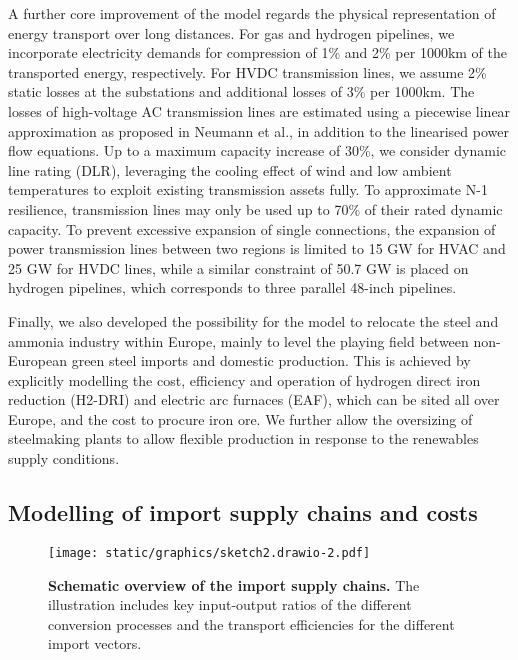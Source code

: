 A further core improvement of the model regards the physical representation of
energy transport over long distances. For gas and hydrogen pipelines, we
incorporate electricity demands for compression of 1\% and 2\% per 1000km
of the transported energy, respectively.\cite{gasforclimateEuropeanHydrogen2021}
For HVDC transmission lines, we assume 2\% static losses at the substations and
additional losses of 3\% per 1000km. The losses of high-voltage AC transmission
lines are estimated using a piecewise linear approximation as proposed in
Neumann et al.,\cite{neumannAssessmentsLinear2022} in addition to the linearised
power flow equations.\cite{horschLinearOptimal2018} Up to a maximum capacity
increase of 30\%, we consider dynamic line rating (DLR), leveraging the cooling
effect of wind and low ambient temperatures to exploit existing transmission
assets fully.\cite{glaumLeveragingExisting2023} To approximate N-1 resilience,
transmission lines may only be used up to 70\% of their rated dynamic capacity.
To prevent excessive expansion of single connections, the expansion of power
transmission lines between two regions is limited to 15 GW for HVAC and 25 GW
for HVDC lines, while a similar constraint of 50.7 GW is placed on hydrogen
pipelines, which corresponds to three parallel 48-inch
pipelines.\cite{gasforclimateEuropeanHydrogen2021}

Finally, we also developed the possibility for the model to relocate the steel
and ammonia industry within Europe, mainly to level the playing field between
non-European green steel imports and domestic production. This is achieved by
explicitly modelling the cost, efficiency and operation of hydrogen direct iron
reduction (H2-DRI) and electric arc furnaces (EAF), which can be sited all over
Europe, and the cost to procure iron ore. We further allow the oversizing of
steelmaking plants to allow flexible production in response to the renewables
supply conditions.

\subsection*{Modelling of import supply chains and costs}

\begin{figure*}
    \centering
    \texttt{[image: static/graphics/sketch2.drawio-2.pdf]}
    \caption{\textbf{Schematic overview of the import supply chains.} The
    illustration includes key input-output ratios of the different conversion
    processes and the transport efficiencies for the different import vectors.}
    \label{fig:import-esc-scheme}
\end{figure*}

